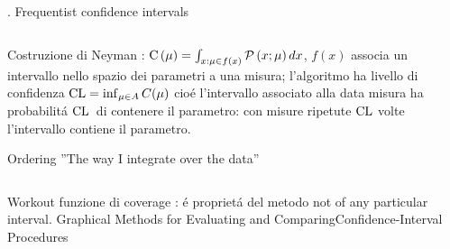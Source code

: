 \documentclass[asd-beamer.tex]{subfiles}
\begin{document}
\begin{frame}{. Frequentist confidence intervals}
\begin{columns}[T]
\begin{column}{0.6\textwidth}
	\begin{block}{Costruzione di Neyman}
		: $\operatorname{C}{(\mu)}=\int_{x:\mu\in f(x)}\operatorname{\mathcal{P}}{(x;\mu)}\,dx$, $f(x)$ associa un intervallo nello spazio dei parametri a una misura; l'algoritmo ha livello di confidenza $\operatorname{CL}=\inf_{\mu\in A}C(\mu)$ cio\'e l'intervallo associato alla data misura ha probabilit\'a $\operatorname{CL}{}$ di contenere il parametro: con misure ripetute $\operatorname{CL}$ volte l'intervallo contiene il parametro.
	\end{block}
	\begin{block}{Ordering}
		''The way I integrate over the data''
	\end{block}
\end{column}
\end{columns}
\end{frame}

\begin{wordonframe}{Workout funzione di coverage}
: \'e propriet\'a del metodo not of any particular interval.
Graphical Methods for Evaluating and ComparingConfidence-Interval Procedures
\end{wordonframe}
\end{document}
